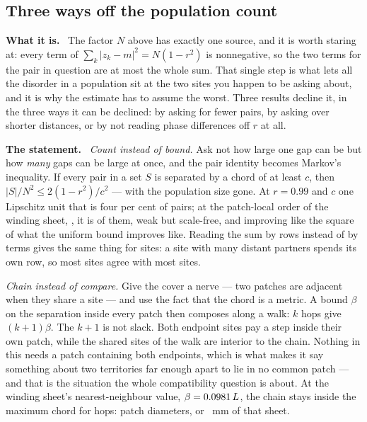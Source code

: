 \documentclass[11pt]{article}
\newcommand{\what}{\par\smallskip\noindent\textbf{What it is.}\ }
\newcommand{\statement}{\par\smallskip\noindent\textbf{The statement.}\ }
\begin{document}
\subsection{Three ways off the population count}
\label{sec:off-the-count}

\what
The factor $N$ above has exactly one source, and it is worth staring at:
every term of $\sum_k|z_k-m|^2=N(1-r^{2})$ is nonnegative, so the two terms for
the pair in question are at most the whole sum. That single step is what lets
all the disorder in a population sit at the two sites you happen to be asking
about, and it is why the estimate has to assume the worst. Three results
decline it, in the three ways it can be declined: by asking for fewer pairs, by
asking over shorter distances, or by not reading phase differences off $r$ at
all.

\statement
\emph{Count instead of bound.} Ask not how large one gap can be but how
\emph{many} gaps can be large at once, and the pair identity becomes Markov's
inequality. If every pair in a set $S$ is separated by a chord of at least $c$,
then $|S|/N^{2}\le2(1-r^{2})/c^{2}$ --- with the population size gone. At
$r=0.99$ and $c$ one Lipschitz unit that is four per cent of pairs; at the
patch-local order of the winding sheet, \waveBandLocalOrder, it is
\wavePatchPairFraction{} of them, weak but scale-free, and improving like the
square of what the uniform bound improves like. Reading the sum by rows instead
of by terms gives the same thing for sites: a site with many distant partners
spends its own row, so most sites agree with most sites.

\emph{Chain instead of compare.} Give the cover a nerve --- two patches are
adjacent when they share a site --- and use the fact that the chord is a metric.
A bound $\beta$ on the separation inside every patch then composes along a walk:
$k$ hops give $(k+1)\beta$. The $k+1$ is not slack. Both endpoint sites pay a
step inside their own patch, while the shared sites of the walk are interior to
the chain. Nothing in this needs a patch containing both endpoints, which is
what makes it say something about two territories far enough apart to lie in no
common patch --- and that is the situation the whole compatibility question is
about. At the winding sheet's nearest-neighbour value,
$\beta=0.0981\,L$, the chain stays inside the maximum chord
for \waveNerveHops{} hops: \waveNerveDiameters{} patch diameters, or
\waveNerveReachMm~mm of that sheet.
\end{document}
